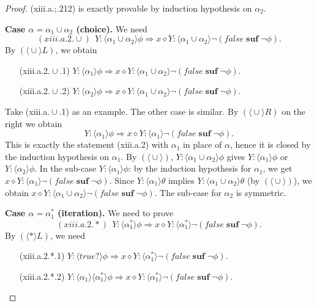 \documentclass[manuscript,screen]{acmart}
\newcommand{\la}[0]{\langle}
\newcommand{\ra}[0]{\rangle}
\newcommand{\true}[0]{\mathit{true}}
\newcommand{\false}[0]{\mathit{false}}
\DeclareMathOperator{\cho}{\cup}
\newcommand{\lup}[0]{*}
\newcommand{\cat}[0]{\diamond}
\DeclareMathOperator{\osuf}{\mathbf{suf}}
\newcommand{\A}[1]{\mbox{ \textbf{#1} }}
\newcommand{\EMO}{\A{EMO}}
\begin{document}
\begin{proof}
(xiii.a.;.212) is exactly provable by induction hypothesis on $\alpha_2$. 
\fi

\textbf{Case $\alpha = \alpha_1\cho\alpha_2$ (choice).} 
We need 
$$
(xiii.a.2.\cho)\ \ Y : \la\alpha_1\cup \alpha_2\ra\phi\Rightarrow x\cat Y : \la\alpha_1\cup \alpha_2\ra\neg(\false\osuf\neg\phi).
$$
By $(\la\cho\ra L)$, we obtain 
\begin{enumerate}
\item[(xiii.a.2.$\cho$.1)] $Y : \la\alpha_1\ra\phi\Rightarrow x\cat Y : \la\alpha_1\cup \alpha_2\ra\neg(\false\osuf\neg\phi)$.
\item[(xiii.a.2.$\cho$.2)] $Y : \la\alpha_2\ra\phi\Rightarrow x\cat Y : \la\alpha_1\cup \alpha_2\ra\neg(\false\osuf\neg\phi)$. 
\end{enumerate}
Take (xiii.a.$\cho$.1) as an example. The other case is similar. 
By $(\la\cho\ra R)$ on the right we obtain
$$
Y : \la\alpha_1\ra\phi\Rightarrow x\cat Y : \la\alpha_1\ra\neg(\false\osuf\neg \phi). 
$$
 This is exactly the statement (xiii.a.2) with $\alpha_1$ in place of $\alpha$, hence it is closed by the induction hypothesis on $\alpha_1$. %
\ifx
By $(\la\cho\ra)$, $Y : \la\alpha_1\cho\alpha_2\ra\phi$ gives $Y : \la\alpha_1\ra\phi$ or $Y : \la\alpha_2\ra\phi$. In the sub-case $Y : \la\alpha_1\ra\phi$: by the induction hypothesis for $\alpha_1$, we get 
$x\cat Y : \la\alpha_1\ra\neg(\false\osuf\neg\phi)$.  
Since $Y : \la\alpha_1\ra\theta$ implies $Y : \la\alpha_1\cho\alpha_2\ra\theta$ (by $(\la\cho\ra)$), we obtain $x\cat Y : \la\alpha_1\cho\alpha_2\ra\neg(\false\osuf\neg\phi)$. The sub-case for $\alpha_2$ is symmetric.
\fi

\textbf{Case $\alpha = \alpha_1^*$ (iteration).} 
We need to prove
$$
(xiii.a.2.*)\ \ Y : \la\alpha^*_1\ra\phi\Rightarrow x\cat Y : \la\alpha^*_1\ra\neg(\false\osuf\neg\phi).
$$
By $(\la\lup\ra L)$, %
we need
\begin{enumerate}
\item[(xiii.a.2.*.1)] $Y : \la\true?\ra\phi\Rightarrow x\cat Y : \la\alpha^*_1\ra\neg(\false\osuf\neg\phi)$. 
\item[(xiii.a.2.*.2)]  $Y : \la\alpha_1\ra\la\alpha_1^*\ra\phi\Rightarrow x\cat Y : \la\alpha^*_1\ra\neg(\false\osuf\neg\phi)$. 
\end{enumerate}


\end{proof}
\end{document}
